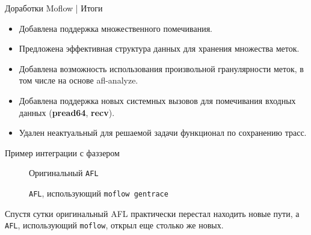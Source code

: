 \documentclass[10pt]{beamer}
\begin{document}
\begin{frame}{Доработки Moflow | Итоги}
\begin{itemize}
 \item Добавлена поддержка множественного помечивания.
 \item Предложена эффективная структура данных для хранения множества меток.
 \item Добавлена возможность использования произвольной гранулярности меток, в том числе на основе afl-analyze.
 \item Добавлена поддержка новых системных вызовов для помечивания входных данных (\textbf{pread64}, \textbf{recv}).
 \item Удален неактуальный для решаемой задачи функционал по сохранению трасс.

\end{itemize}
\end{frame}

\begin{frame}{Пример интеграции с фаззером}
\begin{figure}[H]
    \caption{\tiny{Оригинальный \texttt{AFL}}}
\end{figure}
\begin{figure}[H]
      \caption{\tiny{\texttt{AFL}, использующий \texttt{moflow gentrace}}}
\end{figure}
  \small{Спустя сутки оригинальный AFL практически перестал находить новые пути, а \texttt{AFL}, использующий \texttt{moflow}, открыл еще столько же новых}.
\end{frame}
\end{document}
